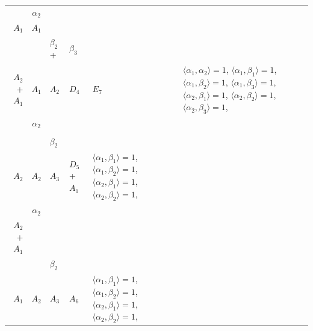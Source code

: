 \documentclass[12pt]{report}
\begin{document}
\begin{appendix}
{\begin{longtable}{rcl p{1cm}p{1cm}p{3cm} }
\\
\begin{tabular}{cc}$\alpha_1$+ & $\alpha_2$\\\tiny{ $A_1$ } & \tiny{ $A_1$ }\end{tabular} &\begin{tabular}{c} = \\~ \end{tabular} & \begin{tabular}{ccc}$\beta_1$+ & $\beta_2$+ & $\beta_3$\\\tiny{ $A_2$+$A_1$ } & \tiny{ $A_1$ } & \tiny{ $A_2$ }\end{tabular} & $D_4$ & $E_7$ & $\langle\alpha_1, \alpha_2\rangle=1$,  $\langle\alpha_1, \beta_1\rangle=1$, $\langle\alpha_1, \beta_2\rangle=1$, $\langle\alpha_1, \beta_3\rangle=1$, $\langle\alpha_2, \beta_1\rangle=1$, $\langle\alpha_2, \beta_2\rangle=1$, $\langle\alpha_2, \beta_3\rangle=1$, 
\\
\begin{tabular}{cc}$\alpha_1$+ & $\alpha_2$\\\tiny{  } & \tiny{  }\end{tabular} &\begin{tabular}{c} = \\~ \end{tabular} & \begin{tabular}{cc}$\beta_1$+ & $\beta_2$\\\tiny{ $A_2$ } & \tiny{ $A_2$ }\end{tabular} & $A_3$ & $D_5$+$A_1$ &  $\langle\alpha_1, \beta_1\rangle=1$, $\langle\alpha_1, \beta_2\rangle=1$, $\langle\alpha_2, \beta_1\rangle=1$, $\langle\alpha_2, \beta_2\rangle=1$, 
\\
\begin{tabular}{cc}$\alpha_1$+ & $\alpha_2$\\\tiny{ $A_2$+$A_1$ } & \tiny{  }\end{tabular} &\begin{tabular}{c} = \\~ \end{tabular} & \begin{tabular}{cc}$\beta_1$+ & $\beta_2$\\\tiny{ $A_1$ } & \tiny{ $A_2$ }\end{tabular} & $A_3$ & $A_6$ &  $\langle\alpha_1, \beta_1\rangle=1$, $\langle\alpha_1, \beta_2\rangle=1$, $\langle\alpha_2, \beta_1\rangle=1$, $\langle\alpha_2, \beta_2\rangle=1$, 
\\

\end{longtable}}
\end{appendix}
\end{document}
